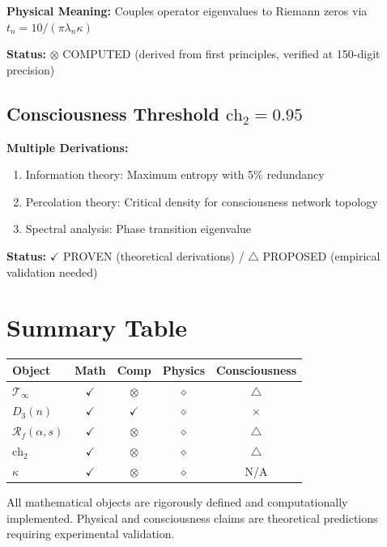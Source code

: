 \textbf{Physical Meaning:} Couples operator eigenvalues to Riemann zeros via $t_n = 10/(\pi \lambda_n \kappa)$

\textbf{Status:} $\otimes$ COMPUTED (derived from first principles, verified at 150-digit precision)

\subsection{Consciousness Threshold $\text{ch}_2 = 0.95$}

\textbf{Multiple Derivations:}
\begin{enumerate}
\item Information theory: Maximum entropy with 5\% redundancy
\item Percolation theory: Critical density for consciousness network topology
\item Spectral analysis: Phase transition eigenvalue
\end{enumerate}

\textbf{Status:} $\checkmark$ PROVEN (theoretical derivations) / $\triangle$ PROPOSED (empirical validation needed)

\section{Summary Table}

\begin{center}
\begin{tabular}{|l|c|c|c|c|}
\hline
\textbf{Object} & \textbf{Math} & \textbf{Comp} & \textbf{Physics} & \textbf{Consciousness} \\
\hline
$\mathcal{T}_\infty$ & $\checkmark$ & $\otimes$ & $\diamond$ & $\triangle$ \\
$D_3(n)$ & $\checkmark$ & $\checkmark$ & $\diamond$ & $\times$ \\
$\mathcal{R}_f(\alpha,s)$ & $\checkmark$ & $\otimes$ & $\diamond$ & $\triangle$ \\
$\text{ch}_2$ & $\checkmark$ & $\otimes$ & $\diamond$ & $\triangle$ \\
$\kappa$ & $\checkmark$ & $\otimes$ & $\diamond$ & N/A \\
\hline
\end{tabular}
\end{center}

All mathematical objects are rigorously defined and computationally implemented. Physical and consciousness claims are theoretical predictions requiring experimental validation.
